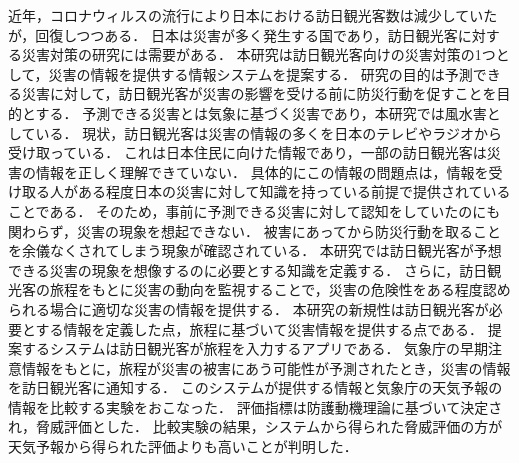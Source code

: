 

近年，コロナウィルスの流行により日本における訪日観光客数は減少していたが，回復しつつある．
日本は災害が多く発生する国であり，訪日観光客に対する災害対策の研究には需要がある．
本研究は訪日観光客向けの災害対策の1つとして，災害の情報を提供する情報システムを提案する．
研究の目的は予測できる災害に対して，訪日観光客が災害の影響を受ける前に防災行動を促すことを目的とする．
予測できる災害とは気象に基づく災害であり，本研究では風水害としている．
現状，訪日観光客は災害の情報の多くを日本のテレビやラジオから受け取っている．
これは日本住民に向けた情報であり，一部の訪日観光客は災害の情報を正しく理解できていない．
具体的にこの情報の問題点は，情報を受け取る人がある程度日本の災害に対して知識を持っている前提で提供されていることである．
そのため，事前に予測できる災害に対して認知をしていたのにも関わらず，災害の現象を想起できない．
被害にあってから防災行動を取ることを余儀なくされてしまう現象が確認されている．
本研究では訪日観光客が予想できる災害の現象を想像するのに必要とする知識を定義する．
さらに，訪日観光客の旅程をもとに災害の動向を監視することで，災害の危険性をある程度認められる場合に適切な災害の情報を提供する．
本研究の新規性は訪日観光客が必要とする情報を定義した点，旅程に基づいて災害情報を提供する点である．
提案するシステムは訪日観光客が旅程を入力するアプリである．
気象庁の早期注意情報をもとに，旅程が災害の被害にあう可能性が予測されたとき，災害の情報を訪日観光客に通知する．
このシステムが提供する情報と気象庁の天気予報の情報を比較する実験をおこなった．
評価指標は防護動機理論に基づいて決定され，脅威評価とした．
比較実験の結果，システムから得られた脅威評価の方が天気予報から得られた評価よりも高いことが判明した．